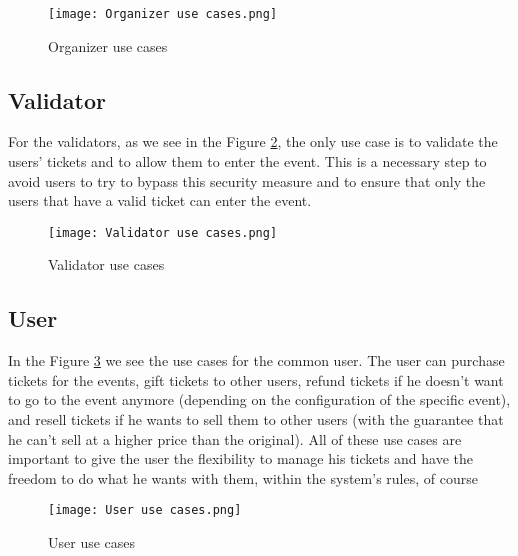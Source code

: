 \begin{figure}[H]
    \texttt{[image: Organizer use cases.png]}
    \centering
    \caption{Organizer use cases}
    \label{fig:organizer_use_cases}
\end{figure}

\subsection{Validator}
\label{subsec:validator}

For the validators, as we see in the Figure \ref{fig:validator_use_cases}, the
only use case is to validate the users' tickets and to allow them to enter the
event. This is a necessary step to avoid users to try to bypass this security
measure and to ensure that only the users that have a valid ticket can enter
the event.

\begin{figure}[H]
    \texttt{[image: Validator use cases.png]}
    \centering
    \caption{Validator use cases}
    \label{fig:validator_use_cases}
\end{figure}

\subsection{User}
\label{subsec:user}

In the Figure \ref{fig:user_use_cases} we see the use cases for the common
user. The user can purchase tickets for the events, gift tickets to other
users, refund tickets if he doesn't want to go to the event anymore (depending
on the configuration of the specific event), and resell tickets if he wants to
sell them to other users (with the guarantee that he can't sell at a higher
price than the original). All of these use cases are important to give the user
the flexibility to manage his tickets and have the freedom to do what he wants
with them, within the system's rules, of course

\begin{figure}[H]
    \texttt{[image: User use cases.png]}
    \centering
    \caption{User use cases}
    \label{fig:user_use_cases}
\end{figure}
